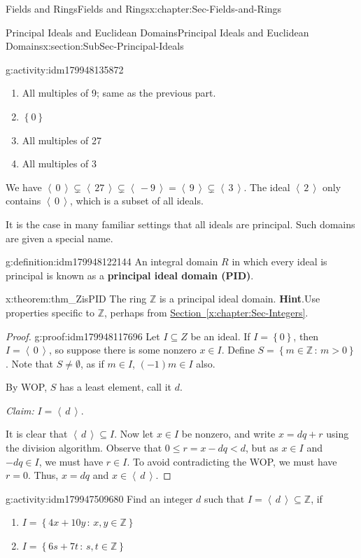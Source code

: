 \documentclass[oneside,10pt,]{book}
\newcommand{\blocktitlefont}{\relax}
\newcommand{\xreffont}{\relax}
\newcommand{\terminology}[1]{\textbf{#1}}
\numberwithin{equation}{section}
\renewcommand{\le}{\leqslant}
\newcommand{\ideal}[1]{\left\langle\, #1 \,\right\rangle}
\newcommand{\set}[1]{\left\{ {#1} \right\}}
\newcommand{\setof}[2]{{\left\{#1\,\colon\,#2\right\}}}
\def\Z{{\mathbb Z}}
\newcommand{\lt}{<}
\begin{document}
\begin{chapterptx}{Fields and Rings}{}{Fields and Rings}{}{}{x:chapter:Sec-Fields-and-Rings}
\begin{sectionptx}{Principal Ideals and Euclidean Domains}{}{Principal Ideals and Euclidean Domains}{}{}{x:section:SubSec-Principal-Ideals}
\begin{activity}{}{g:activity:idm179948135872}
\begin{enumerate}
\item{}All multiples of 9; same as the previous part.%
\item{}\(\set{0}\)%
\item{}All multiples of 27%
\item{}All multiples of 3%
\end{enumerate}
We have \(\ideal{0}\subsetneq \ideal{27}\subsetneq \ideal{-9} = \ideal{9} \subsetneq \ideal{3}\). The ideal \(\ideal{2}\) only contains \(\ideal{0}\), which is a subset of all ideals.%
\end{activity}
It is the case in many familiar settings that all ideals are principal. Such domains are given a special name.%
\begin{definition}{}{g:definition:idm179948122144}%
An integral domain \(R\) in which every ideal is principal is known as a \terminology{principal ideal domain (PID)}.%
\end{definition}
\begin{theorem}{}{}{x:theorem:thm_ZisPID}%
The ring \(\Z\) is a principal ideal domain.%
\textbf{\blocktitlefont Hint}.\quad{}Use properties specific to \(\Z\), perhaps from \hyperref[x:chapter:Sec-Integers]{Section~{\xreffont\ref{x:chapter:Sec-Integers}}}.%
\end{theorem}
\begin{proof}{}{g:proof:idm179948117696}
Let \(I\subseteq Z\) be an ideal. If \(I = \set{0}\), then \(I = \ideal{0}\), so suppose there is some nonzero \(x\in I\). Define \(S = \setof{m\in \Z}{m > 0}\). Note that \(S\ne \emptyset\), as if \(m\in I\), \((-1)m \in I\) also.%
\par
By WOP, \(S\) has a least element, call it \(d\).%
\par
\emph{Claim:} \(I = \ideal{d}\).%
\par
It is clear that \(\ideal{d}\subseteq I\). Now let \(x\in I\) be nonzero, and write \(x = dq + r\) using the division algorithm. Observe that \(0 \le r = x - dq \lt d\), but as \(x\in I\) and \(-dq \in I\), we must have \(r\in I\). To avoid contradicting the WOP, we must have \(r = 0\). Thus, \(x = dq\) and \(x\in \ideal{d}\).%
\end{proof}
\begin{activity}{}{g:activity:idm179947509680}%
Find an integer \(d\) such that \(I = \ideal{d}\subseteq \Z\), if%
\begin{enumerate}
\item{}\(I = \setof{4x+10y}{x,y\in\Z}\)%
\item{}\(I = \setof{6s+7t}{s,t\in\Z}\)%

\end{enumerate}
\end{activity}
\end{sectionptx}
\end{chapterptx}
\end{document}
